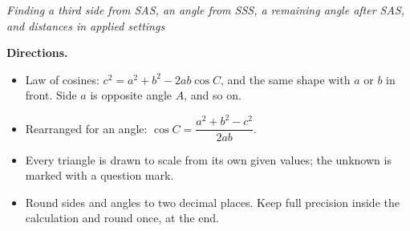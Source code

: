 \documentclass[12pt]{article}
\begin{document}


\begin{center}\small\textit{Finding a third side from SAS, an angle from SSS, a remaining angle after SAS, and distances in applied settings}\end{center}

\vspace{0.1cm}
\noindent\textbf{Directions.}
\begin{itemize}[leftmargin=0.9cm, itemsep=1pt, topsep=3pt]
  \item Law of cosines: $c^2 = a^2 + b^2 - 2ab\cos C$, and the same shape with $a$ or $b$ in front. Side $a$ is opposite angle $A$, and so on.
  \item Rearranged for an angle: $\cos C = \dfrac{a^2 + b^2 - c^2}{2ab}$.
  \item Every triangle is drawn to scale from its own given values; the unknown is marked with a question mark.
  \item Round sides and angles to two decimal places. Keep full precision inside the calculation and round once, at the end.
\end{itemize}
\vspace{0.1cm}







\end{document}
